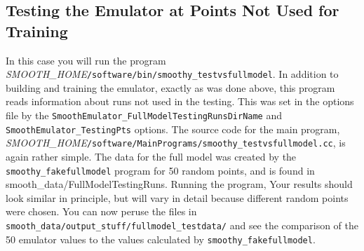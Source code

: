 \documentclass[UserManual.tex]{subfiles}
\begin{document}
\begin{sloppypar}
\subsection{Testing the Emulator at Points Not Used for Training}
In this case you will run the program \textit{SMOOTH\_HOME}{\tt /software/bin/smoothy\_testvsfullmodel}. In addition to building and training the emulator, exactly as was done above, this program reads information about runs not used in the testing. This was set in the options file by the {\tt SmoothEmulator\_FullModelTestingRunsDirName} and {\tt SmoothEmulator\_TestingPts} options. The source code for the main program, \textit{SMOOTH\_HOME}{\tt /software/MainPrograms/smoothy\_testvsfullmodel.cc}, is again rather simple. 
\vspace*{-8pt}
The data for the full model was created by the {\tt smoothy\_fakefullmodel} program for 50 random points, and is found in {smooth\_data/FullModelTestingRuns}. Running the program,
\vspace*{-8pt}
Your results should look similar in principle, but will vary in detail because different random points were chosen. You can now peruse the files in {\tt smooth\_data/output\_stuff/fullmodel\_testdata/} and see the comparison of the 50 emulator values to the values calculated by {\tt smoothy\_fakefullmodel}. 


\end{sloppypar}
\end{document}
